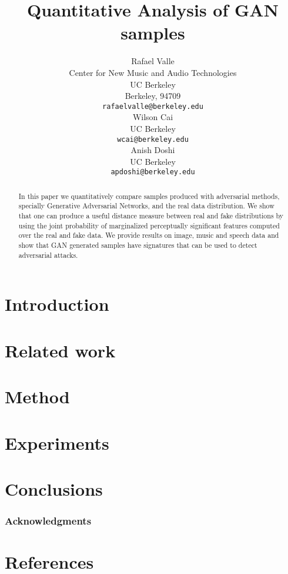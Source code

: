 \documentclass{article}
\title{Quantitative Analysis of GAN samples}
\author{
  Rafael Valle \\
  Center for New Music and Audio Technologies \\
  UC Berkeley \\
  Berkeley, 94709 \\
  \texttt{rafaelvalle@berkeley.edu} \\
  \And
  Wilson Cai\\
  UC Berkeley\\
  \texttt{wcai@berkeley.edu} \\
  \And
  Anish Doshi\\
  UC Berkeley\\
  \texttt{apdoshi@berkeley.edu} \\
}
\begin{document}

\maketitle

\begin{abstract}
    In this paper we quantitatively compare samples produced with adversarial
    methods, specially Generative Adversarial Networks, and the real data
    distribution. We show that one can produce a useful distance measure
    between real and fake distributions by using the joint probability of 
    marginalized perceptually significant features computed over the real and
    fake data. We provide results on image, music and speech data and show 
    that GAN generated samples have signatures that can be used to detect 
    adversarial attacks.
\end{abstract}

\theoremseparator{:}
\newtheorem{hyp}{Hypothesis}

\section{Introduction} \label{sec:introduction}

%
\section{Related work}\label{sec:related_work}

%
\section{Method}\label{sec:method}

%
\section{Experiments}\label{sec:experiments}

%
\section{Conclusions}\label{sec:conclusions}

%

\subsubsection*{Acknowledgments}


\section*{References}

\end{document}
